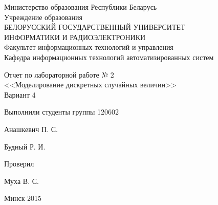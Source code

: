 \thispagestyle{empty}
\setlength{\parindent}{0ex} %

\begin{center}
  Министерство образования Республики Беларусь \\
  \vspace{0.5ex}
  Учреждение образования \\
  БЕЛОРУССКИЙ ГОСУДАРСТВЕННЫЙ УНИВЕРСИТЕТ \\
  ИНФОРМАТИКИ И РАДИОЭЛЕКТРОНИКИ \\
  \vspace{0.5ex}
  Факультет информационных технологий и управления \\
  \vspace{0.5ex}
  Кафедра информационных технологий автоматизированных систем
\end{center}

\vspace{50mm}

\begin{center}
  Отчет по лабораторной работе № 2 \\
  <<Моделирование дискретных случайных величин>> \\
  Вариант 4
\end{center}

\vspace{40mm}

\begin{minipage}{.55\linewidth}
    Выполнили студенты группы 120602
    \bigskip
\end{minipage}
\hfill
\begin{minipage}{.4\linewidth}
  \begin{flushright}
    Анашкевич П. С.

    Будный Р. И.
  \end{flushright}
\end{minipage}

\vspace{10mm}

\begin{minipage}{.55\linewidth}
    Проверил
\end{minipage}
\hfill
\begin{minipage}{.4\linewidth}
  \begin{flushright}
    Муха В. С.

  \end{flushright}
\end{minipage}

\vspace{40mm}
\begin{center}
  Минск 2015
\end{center}

\setlength{\parindent}{5ex} %

\newpage
